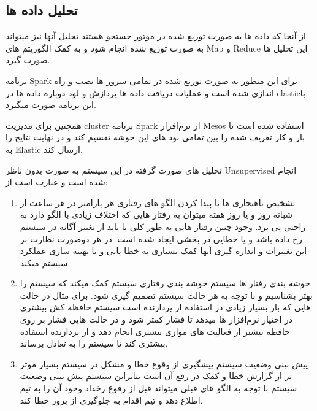 \documentclass{llncs}
\begin{document}
\subsection{تحلیل داده ها}
از آنجا که داده ها به صورت توزیع شده در موتور جستجو هستند تحلیل آنها نیز میتواند به صورت توزیع شده انجام شود و به کمک الگوریتم های Map و Reduce این تحلیل ها صورت گیرد.

برنامه Spark برای این منظور به صورت توزیع شده در تمامی سرور ها نصب و راه اندازی شده است و عملیات دریافت داده ها پردازش و لود دوباره داده ها در elasticبا این برنامه صورت میگیرد.

همچنین برای مدیریت cluster برنامه Spark از نرم‌افزار Mesos استفاده شده است تا بار و کار تعریف شده را بین تمامی نود های این خوشه تقسیم کند و در نهایت نتایج را به Elastic ارسال کند.

تحلیل های صورت گرفته در این سیستم به صورت بدون ناظر Unsupervised انجام شده است و عبارت است از:
\begin{enumerate}
    \item تشخیص ناهنجاری ها
    \newline
    با پیدا کردن الگو های رفتاری هر پارامتر در هر ساعت از شبانه روز و یا روز هفته میتوان به رفتار هایی که اختلاف زیادی با الگو دارد به راحتی پی برد.
    وجود چنین رفتار هایی به طور کلی یا باید از تغییر آگانه در سیستم رخ داده باشد و یا خطایی در بخشی ایجاد شده است.
    در هر دوصورت نظارت بر این تغییرات و اندازه گیری آنها کمک بسیاری به خطا یابی و یا بهینه سازی عملکرد سیستم میکند.
    \item خوشه بندی رفتار ها سیستم
    \newline
    خوشه بندی رفتاری سیستم کمک میکند که سیستم را بهتر بشناسیم و با توجه به هر حالت سیستم تصمیم گیری شود.
    برای مثال در حالت هایی که بار بسیار زیادی در استفاده از پردازنده است سیستم حافظه کش بیشتری در اختیار نرم‌افزار ها میدهد تا فشار کمتر شود و در حالت هایی فشار بر روی حافظه بیشتر از فعالیت های موازی بیشتری انجام دهد و از پردازنده استفاده بیشتری کند تا سیستم را به تعادل برساند.
    \item پیش بینی وضعیت سیستم
    \newline
    پیشگیری از وقوع خطا و مشکل در سیستم بسیار موثر تر از گزارش خطا و کمک در رفع آن است بنابراین سیستم پیش بینی وضعیت سیستم با توجه به الگو های قبلی میتواند قبل از رقوع رخداد وجود آن را به تیم اطلاع دهد و تیم اقدام به جلوگیری از بروز خطا کند.
\end{enumerate}
\end{document}
